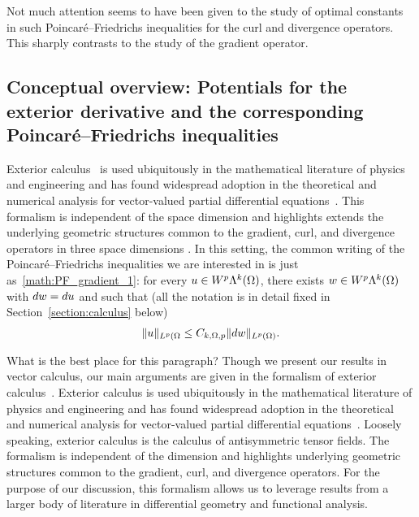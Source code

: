 \documentclass[10pt,a4paper]{article}
\newcommand\cye[1]{%
\protect\leavevmode
\begingroup
    \color{blue}%
    #1%
\endgroup
}
\newcommand{\mwl}[1]{{\color{red}#1}}
\begin{document}
Not much attention seems to have been given to the study of optimal constants in such Poincar\'e--Friedrichs inequalities for the curl and divergence operators. 
This sharply contrasts to the study of the gradient operator. 





\subsection{Conceptual overview: Potentials for the exterior derivative and the corresponding Poincar\'e--Fried\-richs inequalities} \label{section:intro_EC}

Exterior calculus~\cite{greub1967multilinear,lee2012smooth} is used ubiquitously in the mathematical literature of physics and engineering and has found widespread adoption in the theoretical and numerical analysis for vector-valued partial differential equations~\cite{hiptmair2002finite, gross2004electromagnetic, arnold2006finite, arnold2009geometric, arnold2010finite, demlow2014posteriori, licht2021local, arnold2021complexes}. 
This formalism is independent of the \cye{space} dimension and highlights \cye{extends the} underlying geometric structures common to the gradient, curl, and divergence operators \cye{in three space dimensions}.
\cye{In this setting, the common writing of the Poincar\'e--Friedrichs inequalities we are interested in is just as~\eqref{math:PF_gradient_1}: for every $u \in W^{p}\Lambda^{k}(\Omega)$, there exists $w \in W^{p}\Lambda^{k}(\Omega)$ with $d w = d u$ and such that (all the notation is in detail fixed in Section~\ref{section:calculus} below)
\begin{align} \label{math:PF_DF} 
    \| u \|_{L^{p}(\Omega} \leq  C_{k,\Omega,p} \| d w \|_{L^{p}(\Omega)}.
\end{align} 
}
\mwl{What is the best place for this paragraph?}
Though we present our results in vector calculus, our main arguments are given in the formalism of exterior calculus~\cite{greub1967multilinear,lee2012smooth}. Exterior calculus is used ubiquitously in the mathematical literature of physics and engineering and has found widespread adoption in the theoretical and numerical analysis for vector-valued partial differential equations~\cite{hiptmair2002finite,gross2004electromagnetic,arnold2006finite,arnold2009geometric,arnold2010finite,demlow2014posteriori,licht2021local,arnold2021complexes}. Loosely speaking, exterior calculus is the calculus of antisymmetric tensor fields. The formalism is independent of the dimension and highlights underlying geometric structures common to the gradient, curl, and divergence operators.
For the purpose of our discussion, this formalism allows us to leverage results from a larger body of literature in differential geometry and functional analysis. 
\\ 
\end{document}

